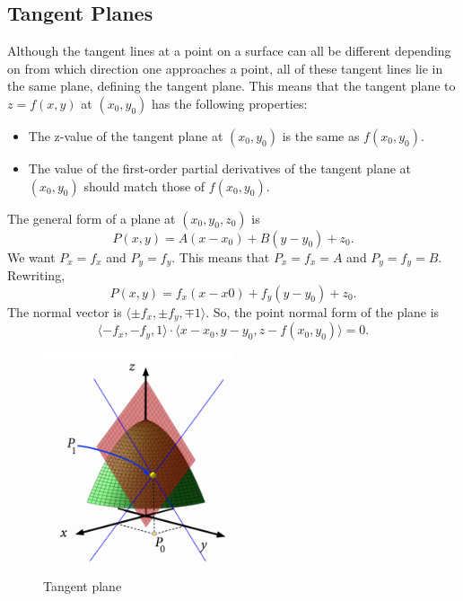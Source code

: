 \subsection{Tangent Planes}
\noindent
Although the tangent lines at a point on a surface can all be different depending on from which direction one approaches a point, all of these tangent lines lie in the same plane, defining the tangent plane.
This means that the tangent plane to $z = f(x, y)$ at $(x_0,y_0)$ has the following properties:
\begin{itemize}
	\item The z-value of the tangent plane at $(x_0, y_0)$ is the same as $f(x_0, y_0)$.
	\item The value of the first-order partial derivatives of the tangent plane at $(x_0, y_0)$ should match those of $f(x_0, y_0)$.
\end{itemize}

\noindent
The general form of a plane at $(x_0, y_0, z_0)$ is
\begin{equation*}
	P(x,y) = A(x-x_0) + B(y-y_0) + z_0.
\end{equation*}
We want $P_x = f_x$ and $P_y = f_y$.
This means that $P_x = f_x = A$ and $P_y = f_y = B$.
Rewriting,
\begin{equation*}
	P(x,y) = f_x(x-x0) + f_y(y-y_0) + z_0.
\end{equation*} 
The normal vector is $\langle \pm f_x,\pm f_y, \mp 1\rangle$.
So, the point normal form of the plane is 
\begin{equation*}
	\langle -f_x, -f_y, 1\rangle \cdot \langle x-x_0, y-y_0, z-f(x_0,y_0) \rangle = 0.
\end{equation*}

\begin{figure}[H]
	\centering
	\includegraphics[width=0.5\textwidth]{./differentialMultivariableCalculus/tangent_plane.png}
	\caption{Tangent plane}
\end{figure}
